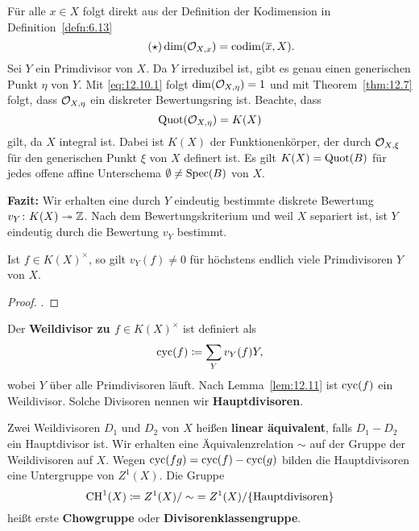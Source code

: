 \begin{bem}
\label{bem:12.10}
	Für alle $x \in X$ folgt direkt aus der Definition der Kodimension in Definition~\ref{defn:6.13}
	\[
		\label{eq:12.10.1}\tag{$\star$}
		\dim(\mathcal{O}_{X,x}) = \operatorname{codim}(\overline{x},X).
	\]
	Sei $Y$ ein Primdivisor von $X$. Da $Y$ irreduzibel ist, gibt es genau einen generischen Punkt $\eta$ von $Y$. Mit \eqref{eq:12.10.1} folgt $\dim(\mathcal{O}_{X,\eta}) = 1$ und mit Theorem~\ref{thm:12.7} folgt, dass $\mathcal{O}_{X,\eta}$ ein diskreter Bewertungsring ist. Beachte, dass 
	\[
		\operatorname{Quot}(\mathcal{O}_{X,\eta}) = K(X)
	\]
	gilt, da $X$ integral ist. Dabei ist $K(X)$ der Funktionenkörper, der durch $\mathcal{O}_{X,\xi}$ für den generischen Punkt $\xi$ von $X$ definert ist. Es gilt $K(X) = \operatorname{Quot}(B)$ für jedes offene affine Unterschema $\emptyset \ne \operatorname{Spec}(B)$ von $X$.

	\textbf{Fazit:} Wir erhalten eine durch $Y$ eindeutig bestimmte diskrete Bewertung $v_Y\colon K(X) \twoheadrightarrow \mathbb {Z}$. Nach dem Bewertungskriterium und weil $X$ separiert ist, ist $Y$ eindeutig durch die Bewertung $v_Y$ bestimmt.
\end{bem}

\begin{lem}
\label{lem:12.11}
	Ist $f \in K(X)^\times$, so gilt $v_Y(f)\ne 0$ für höchstens endlich viele Primdivisoren $Y$ von $X$.
	\begin{proof}
		\cite[Lemma~II.6.1]{hartshorne1977algebraic}.
	\end{proof}
\end{lem}

\begin{defn}
\label{defn:12.12}
	Der \textbf{Weildivisor zu $f\in K(X)^\times$} ist definiert als
	\[
		\operatorname{cyc}(f)\coloneqq \sum_{Y}v_Y(f) Y,
	\]
	wobei $Y$ über alle Primdivisoren läuft. Nach Lemma~\ref{lem:12.11} ist $\operatorname{cyc}(f)$ ein Weildivisor. Solche Divisoren nennen wir \textbf{Hauptdivisoren}.
\end{defn}

\begin{defn}
\label{defn:12.13}
	Zwei Weildivisoren $D_1$ und $D_2$ von $X$ heißen \textbf{linear äquivalent}, falls $D_1-D_2$ ein Hauptdivisor ist. Wir erhalten eine Äquivalenzrelation $\sim$ auf der Gruppe der Weildivisoren auf $X$. Wegen $\operatorname{cyc}(fg) = \operatorname{cyc}(f)-\operatorname{cyc}(g)$ bilden die Hauptdivisoren eine Untergruppe von $Z^1(X)$. Die Gruppe
	\[
		\operatorname{CH}^1(X) \coloneqq Z^1(X)/\sim \; = Z^1(X)/\{\text{Hauptdivisoren}\}
	\]
	heißt erste \textbf{Chowgruppe} oder \textbf{Divisorenklassengruppe}.
\end{defn}

